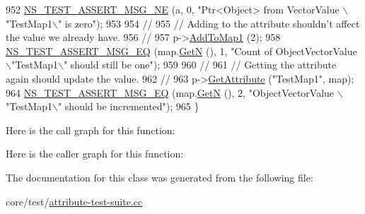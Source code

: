 \begin{DoxyCode}
952   \hyperlink{group__testing_ga73d66fb0050a5111453fd144e767b91a}{NS\_TEST\_ASSERT\_MSG\_NE} (a, 0, \textcolor{stringliteral}{"Ptr<Object> from VectorValue \(\backslash\)"TestMap1\(\backslash\)" is zero"});
953 
954   \textcolor{comment}{//}
955   \textcolor{comment}{// Adding to the attribute shouldn't affect the value we already have.}
956   \textcolor{comment}{//}
957   p->\hyperlink{classAttributeObjectTest_a7ba7b44a088d14a1a7dd7f941d0d1cfd}{AddToMap1} (2);
958   \hyperlink{group__testing_ga2a9d78cffb3db8e867c35fff0b698cf5}{NS\_TEST\_ASSERT\_MSG\_EQ} (map.\hyperlink{classns3_1_1ObjectPtrContainerValue_a0b282241030189e3f60e76e52d176710}{GetN} (), 1, \textcolor{stringliteral}{"Count of ObjectVectorValue \(\backslash\)"TestMap1\(\backslash\)"
       should still be one"});
959 
960   \textcolor{comment}{//}
961   \textcolor{comment}{// Getting the attribute again should update the value.}
962   \textcolor{comment}{//}
963   p->\hyperlink{classns3_1_1ObjectBase_a895d1de2f96063d0e0fd78463e7a7e30}{GetAttribute} (\textcolor{stringliteral}{"TestMap1"}, map);
964   \hyperlink{group__testing_ga2a9d78cffb3db8e867c35fff0b698cf5}{NS\_TEST\_ASSERT\_MSG\_EQ} (map.\hyperlink{classns3_1_1ObjectPtrContainerValue_a0b282241030189e3f60e76e52d176710}{GetN} (), 2, \textcolor{stringliteral}{"ObjectVectorValue \(\backslash\)"TestMap1\(\backslash\)" should be
       incremented"});
965 \}
\end{DoxyCode}


Here is the call graph for this function\+:




Here is the caller graph for this function\+:




The documentation for this class was generated from the following file\+:\begin{DoxyCompactItemize}
\item 
core/test/\hyperlink{attribute-test-suite_8cc}{attribute-\/test-\/suite.\+cc}\end{DoxyCompactItemize}
